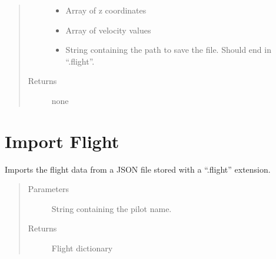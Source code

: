 \documentclass[letterpaper,10pt,english]{sphinxmanual}
\begin{document}
\begin{fulllineitems}
\begin{quote}
\begin{description}
\begin{itemize}
\item {} 
 \textendash{} Array of z coordinates

\item {} 
 \textendash{} Array of velocity values

\item {} 
 \textendash{} String containing the path to save the file. Should end in “.flight”.

\end{itemize}

\item[{Returns}] \leavevmode
none

\end{description}\end{quote}

\end{fulllineitems}



\chapter{Import Flight}
\label{\detokenize{index:module-src.Export.ImportFile}}\label{\detokenize{index:import-flight}}

\begin{fulllineitems}
\label{\detokenize{index:src.Export.ImportFile.importData}}
Imports the flight data from a JSON file stored with a “.flight” extension.
\begin{quote}\begin{description}
\item[{Parameters}] \leavevmode
{} \textendash{} String containing the pilot name.

\item[{Returns}] \leavevmode
Flight dictionary

\end{description}\end{quote}

\end{fulllineitems}
\end{document}
